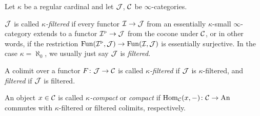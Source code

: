 \begin{defi}\label{def:KappaFiltered}
	Let $\kappa$ be a regular cardinal and let $\mathcal{J}$, $\mathcal{C}$ be $\infty$-categories.
	\begin{alphanumerate}
		\item $\mathcal{J}$ is called \emph{$\kappa$-filtered} if every functor $\mathcal{I}\rightarrow\mathcal{J}$ from an essentially $\kappa$-small $\infty$-category extends to a functor $\mathcal{I}^\triangleright\rightarrow\mathcal{J}$ from the cocone under $\mathcal{C}$, or in other words, if the restriction $\operatorname{Fun}(\mathcal{I}^\triangleright,\mathcal{J})\rightarrow\operatorname{Fun}(\mathcal{I},\mathcal{J})$ is essentially surjective. In the case $\kappa=\aleph_0$, we usually just say $\mathcal{J}$ is \emph{filtered}.\label{enum:KappaFilteredCategory}
		\item A colimit over a functor $F\colon \mathcal{J}\rightarrow\mathcal{C}$ is called \emph{$\kappa$-filtered} if $\mathcal{J}$ is $\kappa$-filtered, and \emph{filtered} if $\mathcal{J}$ is filtered.\label{enum:KappaFilteredColimit}
		\item An object $x\in\mathcal{C}$ is called \emph{$\kappa$-compact} or \emph{compact} if $\operatorname{Hom}_{\mathcal{C}}(x,-)\colon \mathcal{C}\rightarrow\mathrm{An}$ commutes with $\kappa$-filtered or filtered colimits, respectively.\label{enum:KappaCompact} 
	\end{alphanumerate}
\end{defi}
